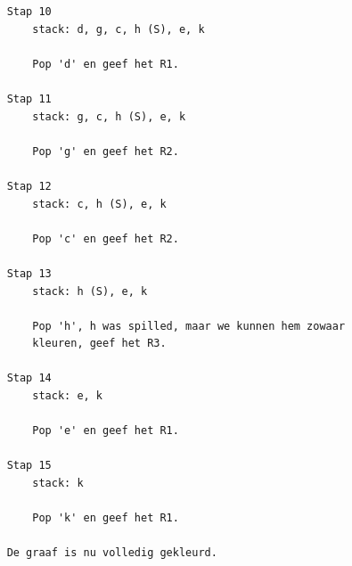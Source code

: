 \documentclass[10pt,a4paper]{article}
\begin{document}
\begin{verbatim}
    Stap 10
        stack: d, g, c, h (S), e, k

        Pop 'd' en geef het R1.

    Stap 11
        stack: g, c, h (S), e, k

        Pop 'g' en geef het R2.

    Stap 12
        stack: c, h (S), e, k

        Pop 'c' en geef het R2.

    Stap 13
        stack: h (S), e, k

        Pop 'h', h was spilled, maar we kunnen hem zowaar
        kleuren, geef het R3.

    Stap 14
        stack: e, k

        Pop 'e' en geef het R1.

    Stap 15
        stack: k

        Pop 'k' en geef het R1.

    De graaf is nu volledig gekleurd.
\end{verbatim}
\end{document}
